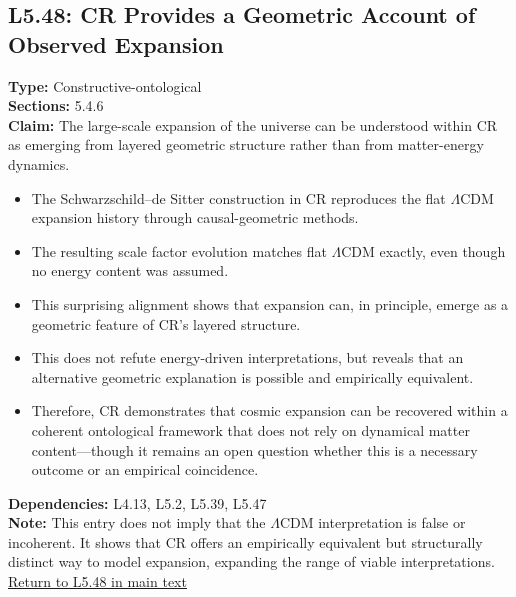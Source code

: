 \documentclass[12pt]{book}
\newcommand{\returnlink}[1]{\hyperref[logic:#1]{Return to #1 in main text}\xspace}
\begin{document}
\subsection*{L5.48: CR Provides a Geometric Account of Observed Expansion}
\label{appendix:L5.48}
\textbf{Type:} Constructive-ontological \\
\textbf{Sections:} 5.4.6 \\
\textbf{Claim:} The large-scale expansion of the universe can be understood within CR as emerging from layered geometric structure rather than from matter-energy dynamics.
\begin{itemize}
  \item The Schwarzschild–de Sitter construction in CR reproduces the flat $\Lambda$CDM expansion history through causal-geometric methods.
  \item The resulting scale factor evolution matches flat $\Lambda$CDM exactly, even though no energy content was assumed.
  \item This surprising alignment shows that expansion can, in principle, emerge as a geometric feature of CR's layered structure.
  \item This does not refute energy-driven interpretations, but reveals that an alternative geometric explanation is possible and empirically equivalent.
  \item Therefore, CR demonstrates that cosmic expansion can be recovered within a coherent ontological framework that does not rely on dynamical matter content---though it remains an open question whether this is a necessary outcome or an empirical coincidence.
\end{itemize}
\textbf{Dependencies:} L4.13, L5.2, L5.39, L5.47 \\
\textbf{Note:} This entry does not imply that the $\Lambda$CDM interpretation is false or incoherent. It shows that CR offers an empirically equivalent but structurally distinct way to model expansion, expanding the range of viable interpretations.\\
\returnlink{L5.48}
\end{document}
